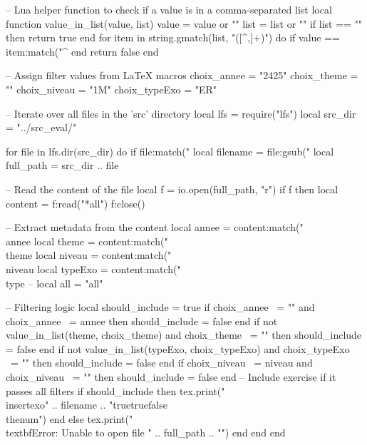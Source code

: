 \documentclass[addpoints,a4paper,12pt]{exam}
\def\choixAnnee{2425}
\def\choixTheme{}%
\def\choixNiveau{1M}
\def\choixTypeExo{ER}
\edef\luaChoixAnnee{\choixAnnee}
\edef\luaChoixTheme{\choixTheme}
\edef\luaChoixNiveau{\choixNiveau}
\edef\luaChoixTypeExo{\choixTypeExo}
\begin{document}
\begin{questions}
\begin{luacode}

-- Lua helper function to check if a value is in a comma-separated list
local function value_in_list(value, list)
    value = value or ""
    list = list or ""
    if list == "" then return true end
    for item in string.gmatch(list, "([^,]+)") do
        if value == item:match("^%
    end
    return false
end

-- Assign filter values from LaTeX macros
choix_annee = "\luaChoixAnnee"
choix_theme = "\luaChoixTheme"
choix_niveau = "\luaChoixNiveau"
choix_typeExo = "\luaChoixTypeExo"

-- Iterate over all files in the 'src' directory
local lfs = require("lfs")
local src_dir = "../src_eval/"

for file in lfs.dir(src_dir) do
    if file:match("%
        local filename = file:gsub("%
        local full_path = src_dir .. file
        
        -- Read the content of the file
        local f = io.open(full_path, "r")
        if f then
            local content = f:read("*all")
            f:close()
            
            -- Extract metadata from the content
            local annee = content:match("\\annee%
            local theme = content:match("\\theme%
            local niveau = content:match("\\niveau%
            local typeExo = content:match("\\type%
	    -- local all = "all"
            
            -- Filtering logic
            local should_include = true
            if choix_annee ~= "" and choix_annee ~= annee then
                should_include = false
            end
            if not value_in_list(theme, choix_theme) and choix_theme ~= "" then
            		should_include = false
            end
	    if not value_in_list(typeExo, choix_typeExo) and choix_typeExo ~= "" then
            		should_include = false
            end
            if choix_niveau ~= niveau and choix_niveau ~= "" then
                should_include = false
            end
            -- Include exercise if it passes all filters
            if should_include then
	    tex.print("\\insertexo{" .. filename .. "}{true}{true}{false}{\\thenum}")
            end
        else
            tex.print("\\textbf{Error: Unable to open file " .. full_path .. "}")
        end
    end
end

\end{luacode}

\end{questions}
\end{document}
